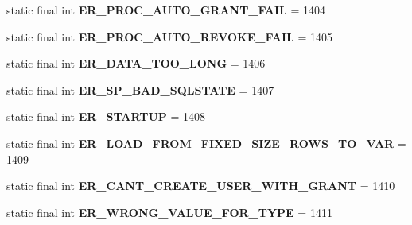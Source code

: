 \begin{DoxyCompactItemize}
static final int {\bfseries E\+R\+\_\+\+P\+R\+O\+C\+\_\+\+A\+U\+T\+O\+\_\+\+G\+R\+A\+N\+T\+\_\+\+F\+A\+IL} = 1404
\item 
\mbox{\label{classcom_1_1mysql_1_1jdbc_1_1_mysql_error_numbers_ae348474dd764022fd0aa3791de91f01a}} 
static final int {\bfseries E\+R\+\_\+\+P\+R\+O\+C\+\_\+\+A\+U\+T\+O\+\_\+\+R\+E\+V\+O\+K\+E\+\_\+\+F\+A\+IL} = 1405
\item 
\mbox{\label{classcom_1_1mysql_1_1jdbc_1_1_mysql_error_numbers_a0bfe4e2ad6da259d248f886b9d5d55b9}} 
static final int {\bfseries E\+R\+\_\+\+D\+A\+T\+A\+\_\+\+T\+O\+O\+\_\+\+L\+O\+NG} = 1406
\item 
\mbox{\label{classcom_1_1mysql_1_1jdbc_1_1_mysql_error_numbers_ac4d96946e667440b6f486b0d071647df}} 
static final int {\bfseries E\+R\+\_\+\+S\+P\+\_\+\+B\+A\+D\+\_\+\+S\+Q\+L\+S\+T\+A\+TE} = 1407
\item 
\mbox{\label{classcom_1_1mysql_1_1jdbc_1_1_mysql_error_numbers_a617cfa4468e52d7acb9da7d98fdb6dd5}} 
static final int {\bfseries E\+R\+\_\+\+S\+T\+A\+R\+T\+UP} = 1408
\item 
\mbox{\label{classcom_1_1mysql_1_1jdbc_1_1_mysql_error_numbers_ae415238711f4b2fa52373f5c406e85f9}} 
static final int {\bfseries E\+R\+\_\+\+L\+O\+A\+D\+\_\+\+F\+R\+O\+M\+\_\+\+F\+I\+X\+E\+D\+\_\+\+S\+I\+Z\+E\+\_\+\+R\+O\+W\+S\+\_\+\+T\+O\+\_\+\+V\+AR} = 1409
\item 
\mbox{\label{classcom_1_1mysql_1_1jdbc_1_1_mysql_error_numbers_a42605494d5ee614236a9b331262e9ed8}} 
static final int {\bfseries E\+R\+\_\+\+C\+A\+N\+T\+\_\+\+C\+R\+E\+A\+T\+E\+\_\+\+U\+S\+E\+R\+\_\+\+W\+I\+T\+H\+\_\+\+G\+R\+A\+NT} = 1410
\item 
\mbox{\label{classcom_1_1mysql_1_1jdbc_1_1_mysql_error_numbers_a7f1c5728d134ea173064e525e00ca5d5}} 
static final int {\bfseries E\+R\+\_\+\+W\+R\+O\+N\+G\+\_\+\+V\+A\+L\+U\+E\+\_\+\+F\+O\+R\+\_\+\+T\+Y\+PE} = 1411

\end{DoxyCompactItemize}
